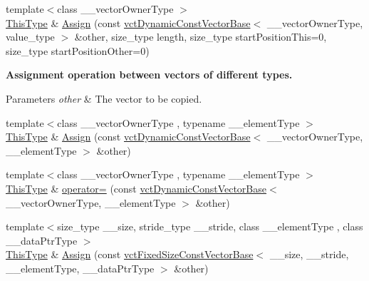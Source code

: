 {\bf }\par
\begin{DoxyCompactItemize}
\item 
{\footnotesize template$<$class \+\_\+\+\_\+vector\+Owner\+Type $>$ }\\\hyperlink{classvct_dynamic_const_vector_base_a39da273523717f678f54d3321ebca3dd}{This\+Type} \& \hyperlink{classvct_dynamic_vector_base_acec7a6bf6e8e611b45dc7c3553ad72d6}{Assign} (const \hyperlink{classvct_dynamic_const_vector_base}{vct\+Dynamic\+Const\+Vector\+Base}$<$ \+\_\+\+\_\+vector\+Owner\+Type, value\+\_\+type $>$ \&other, size\+\_\+type length, size\+\_\+type start\+Position\+This=0, size\+\_\+type start\+Position\+Other=0)
\end{DoxyCompactItemize}

\begin{Indent}{\bf Assignment operation between vectors of different types.}\par
{\em 
\begin{DoxyParams}{Parameters}
{\em other} & The vector to be copied. \\
\hline
\end{DoxyParams}
}\begin{DoxyCompactItemize}
\item 
{\footnotesize template$<$class \+\_\+\+\_\+vector\+Owner\+Type , typename \+\_\+\+\_\+element\+Type $>$ }\\\hyperlink{classvct_dynamic_const_vector_base_a39da273523717f678f54d3321ebca3dd}{This\+Type} \& \hyperlink{classvct_dynamic_vector_base_ad4afb1dd8544f91213679e148f8aa890}{Assign} (const \hyperlink{classvct_dynamic_const_vector_base}{vct\+Dynamic\+Const\+Vector\+Base}$<$ \+\_\+\+\_\+vector\+Owner\+Type, \+\_\+\+\_\+element\+Type $>$ \&other)
\item 
{\footnotesize template$<$class \+\_\+\+\_\+vector\+Owner\+Type , typename \+\_\+\+\_\+element\+Type $>$ }\\\hyperlink{classvct_dynamic_const_vector_base_a39da273523717f678f54d3321ebca3dd}{This\+Type} \& \hyperlink{classvct_dynamic_vector_base_a14b5a93889a05a9d29814b269e6df95e}{operator=} (const \hyperlink{classvct_dynamic_const_vector_base}{vct\+Dynamic\+Const\+Vector\+Base}$<$ \+\_\+\+\_\+vector\+Owner\+Type, \+\_\+\+\_\+element\+Type $>$ \&other)
\item 
{\footnotesize template$<$size\+\_\+type \+\_\+\+\_\+size, stride\+\_\+type \+\_\+\+\_\+stride, class \+\_\+\+\_\+element\+Type , class \+\_\+\+\_\+data\+Ptr\+Type $>$ }\\\hyperlink{classvct_dynamic_const_vector_base_a39da273523717f678f54d3321ebca3dd}{This\+Type} \& \hyperlink{classvct_dynamic_vector_base_a92c5dd44b7b9e737312706c0ba69870b}{Assign} (const \hyperlink{classvct_fixed_size_const_vector_base}{vct\+Fixed\+Size\+Const\+Vector\+Base}$<$ \+\_\+\+\_\+size, \+\_\+\+\_\+stride, \+\_\+\+\_\+element\+Type, \+\_\+\+\_\+data\+Ptr\+Type $>$ \&other)
\end{DoxyCompactItemize}
\end{Indent}
